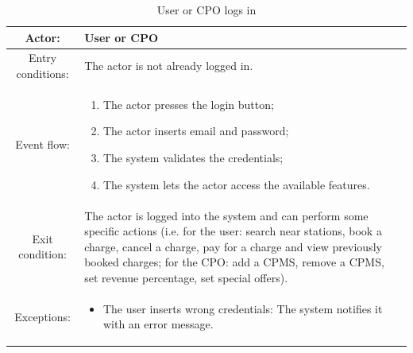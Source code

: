 \begin{table}[h]
    \begin{center}
        \begin{tabular}{|c||p{10cm}|}
            \hline
            Actor:            & User or \ac{CPO}                                                                                                                                                                                                                                                                                             \\
            \hline
            Entry conditions: & The actor is not already logged in.                                                                                                                                                                                                                                                                          \\
            \hline
            Event flow:       &
            \begin{enumerate}
                \item The actor presses the login button;
                \item The actor inserts email and password;
                \item The system validates the credentials;
                \item The system lets the actor access the available features.
            \end{enumerate}
            \\
            \hline
            Exit condition:   & The actor is logged into the system and can perform some specific actions (i.e. for the user: search near stations, book a charge, cancel a charge, pay for a charge and view previously booked charges; for the \ac{CPO}: add a \ac{CPMS}, remove a \ac{CPMS}, set revenue percentage, set special offers). \\
            \hline
            Exceptions:       &
            \begin{itemize}
                \item The user inserts wrong credentials: The system notifies it with an error message.
            \end{itemize}
            \\
            \hline
        \end{tabular}
    \end{center}
    \caption{User or \ac{CPO} logs in}
\end{table}

